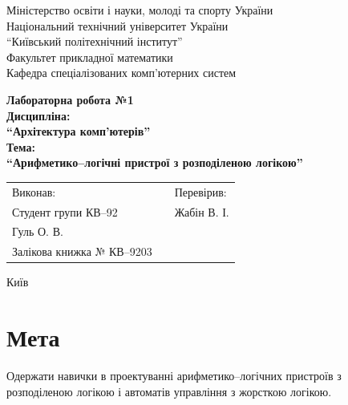\documentclass[a4paper, 10pt]{article}
\begin{document}
\begin{titlepage}
\begin{center}
\large{
Міністерство освіти і науки, молоді та спорту України\\
Національний технічний університет України\\
``Київський політехнічний інститут''\\
Факультет прикладної математики\\
Кафедра спеціалізованих комп’ютерних систем\\
}

\vfill

\large{\bf{
Лабораторна робота №1\\
Дисципліна:\\
``Архітектура комп'ютерів''\\
Тема:\\
``Арифметико--логічні пристрої з розподіленою логікою''\\
}}

\vfill

\begin{table}[h]
\centering
\begin{tabular}{lp{4cm}l}
Виконав:&&Перевірив:\\
Студент групи КВ--92&&Жабін В. І.\\
Гуль О. В.&&\\
Залікова книжка № КВ--9203&&\\
\end{tabular}
\end{table}

\vfill

Київ \the\year
\end{center}
\end{titlepage}
\newpage

\section{Мета}
Одержати навички в проектуванні арифметико--логічних пристроїв з розподіленою логікою і автоматів управління з жорсткою логікою.
\end{document}
